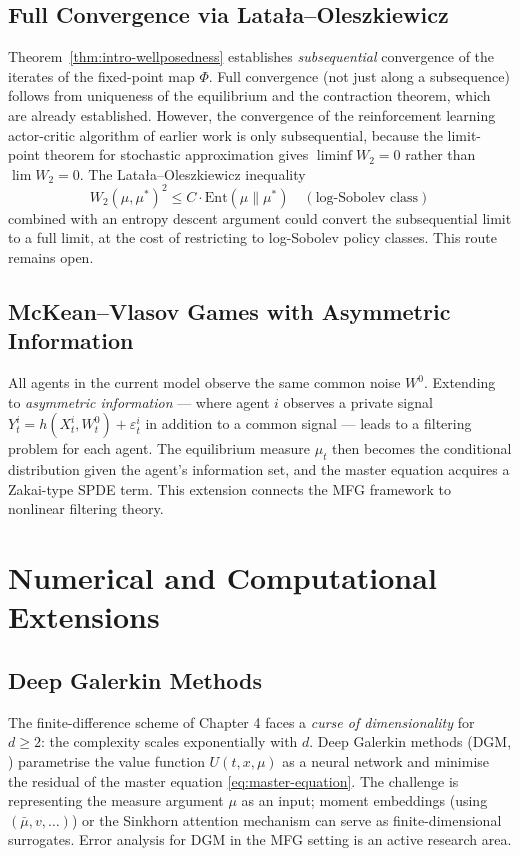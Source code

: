 \subsection{Full Convergence via Lata\l{}a--Oleszkiewicz}

Theorem~\ref{thm:intro-wellposedness} establishes \emph{subsequential} convergence
of the iterates of the fixed-point map $\Phi$. Full convergence (not just along a
subsequence) follows from uniqueness of the equilibrium and the contraction theorem,
which are already established. However, the convergence of the reinforcement
learning actor-critic algorithm of earlier work is only subsequential, because
the limit-point theorem for stochastic approximation gives $\liminf W_2 = 0$
rather than $\lim W_2 = 0$. The Lata\l{}a--Oleszkiewicz inequality
\[
    W_2(\mu, \mu^*)^2 \le C \cdot \mathrm{Ent}(\mu \| \mu^*)
    \quad (\text{log-Sobolev class})
\]
combined with an entropy descent argument could convert the subsequential limit
to a full limit, at the cost of restricting to log-Sobolev policy classes. This
route remains open.

\subsection{McKean--Vlasov Games with Asymmetric Information}

All agents in the current model observe the same common noise $W^0$. Extending to
\emph{asymmetric information} --- where agent $i$ observes a private signal
$Y_t^i = h(X_t^i, W^0_t) + \varepsilon_t^i$ in addition to a common signal ---
leads to a filtering problem for each agent. The equilibrium measure $\mu_t$ then
becomes the conditional distribution given the agent's information set, and the
master equation acquires a Zakai-type SPDE term. This extension connects the MFG
framework to nonlinear filtering theory.

\section{Numerical and Computational Extensions}
\label{sec:fut-numerical}

\subsection{Deep Galerkin Methods}

The finite-difference scheme of Chapter 4 faces a \emph{curse of dimensionality}
for $d \ge 2$: the complexity scales exponentially with $d$. Deep Galerkin methods
(DGM, \citep{sirignano2018}) parametrise the value function $U(t,x,\mu)$ as a
neural network and minimise the residual of the master equation
\eqref{eq:master-equation}. The challenge is representing the measure argument
$\mu$ as an input; moment embeddings (using $(\bar\mu, v, \ldots)$) or the
Sinkhorn attention mechanism can serve as finite-dimensional surrogates. Error
analysis for DGM in the MFG setting is an active research area.

